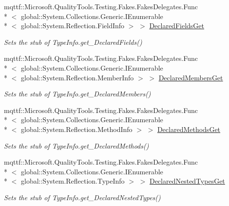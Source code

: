 \begin{DoxyCompactItemize}
mqttf\-::\-Microsoft.\-Quality\-Tools.\-Testing.\-Fakes.\-Fakes\-Delegates.\-Func\\*
$<$ global\-::\-System.\-Collections.\-Generic.\-I\-Enumerable\\*
$<$ global\-::\-System.\-Reflection.\-Field\-Info $>$ $>$ \hyperlink{class_system_1_1_reflection_1_1_fakes_1_1_stub_type_delegator_a393b12b4064d45d6a6be2f79414e6026}{Declared\-Fields\-Get}
\begin{DoxyCompactList}\small\item\em Sets the stub of Type\-Info.\-get\-\_\-\-Declared\-Fields()\end{DoxyCompactList}\item 
mqttf\-::\-Microsoft.\-Quality\-Tools.\-Testing.\-Fakes.\-Fakes\-Delegates.\-Func\\*
$<$ global\-::\-System.\-Collections.\-Generic.\-I\-Enumerable\\*
$<$ global\-::\-System.\-Reflection.\-Member\-Info $>$ $>$ \hyperlink{class_system_1_1_reflection_1_1_fakes_1_1_stub_type_delegator_a34e8c000c09968ca25525207fdf92140}{Declared\-Members\-Get}
\begin{DoxyCompactList}\small\item\em Sets the stub of Type\-Info.\-get\-\_\-\-Declared\-Members()\end{DoxyCompactList}\item 
mqttf\-::\-Microsoft.\-Quality\-Tools.\-Testing.\-Fakes.\-Fakes\-Delegates.\-Func\\*
$<$ global\-::\-System.\-Collections.\-Generic.\-I\-Enumerable\\*
$<$ global\-::\-System.\-Reflection.\-Method\-Info $>$ $>$ \hyperlink{class_system_1_1_reflection_1_1_fakes_1_1_stub_type_delegator_a11f305a5b0b6dcd7ddea17e710884887}{Declared\-Methods\-Get}
\begin{DoxyCompactList}\small\item\em Sets the stub of Type\-Info.\-get\-\_\-\-Declared\-Methods()\end{DoxyCompactList}\item 
mqttf\-::\-Microsoft.\-Quality\-Tools.\-Testing.\-Fakes.\-Fakes\-Delegates.\-Func\\*
$<$ global\-::\-System.\-Collections.\-Generic.\-I\-Enumerable\\*
$<$ global\-::\-System.\-Reflection.\-Type\-Info $>$ $>$ \hyperlink{class_system_1_1_reflection_1_1_fakes_1_1_stub_type_delegator_af5f36285a75a002fa880ab12ccba16da}{Declared\-Nested\-Types\-Get}
\begin{DoxyCompactList}\small\item\em Sets the stub of Type\-Info.\-get\-\_\-\-Declared\-Nested\-Types()\end{DoxyCompactList}\item 

\end{DoxyCompactItemize}
